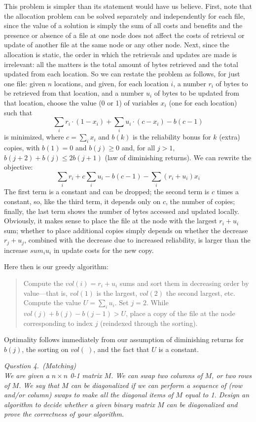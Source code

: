 \documentclass[11pt]{article}
\begin{document}
This problem is simpler than its statement would have us believe.  First, note
that the allocation problem can be solved separately and independently for each
file, since the value of a solution is simply the sum of all costs and benefits
and the presence or absence of a file at one node does not affect the costs of
retrieval or update of another file at the same node or any other node.  Next,
since the allocation is static, the order in which the retrievals and updates
are made is irrelevant: all the matters is the total amount of bytes retrieved
and the total updated from each location.  So we can restate the problem as
follows, for just one file: given $n$ locations, and given, for each location
$i$, a number $r_i$ of bytes to be retrieved from that location, and a number
$u_i$ of bytes to be updated from that location, choose the value (0 or 1) of
variables $x_i$ (one for each location) such that
  $$\sum_i r_i\cdot (1-x_i) + \sum_i u_i\cdot (c-x_i) - b(c-1)$$
is minimized, where $c=\sum_i x_i$ and $b(k)$ is the reliability bonus
for $k$ (extra) copies, with $b(1)=0$ and $b(j)\geq 0$ and, for all $j>1$,
$b(j+2)+b(j)\leq 2b(j+1)$ (law of diminishing returns).
We can rewrite the objective:
  $$\sum_i r_i + c \sum_i u_i - b(c-1) - \sum_i (r_i+u_i) x_i$$
The first term is a constant and can be dropped; the second term is $c$
times a constant, so, like the third term, it depends only on $c$, the
number of copies; finally, the last term shows the number of bytes accessed
and updated locally.  Obviously, it makes sense to
place the file at the node with the largest $r_i+u_i$ sum; whether
to place additional copies simply depends on whether the decrease
$r_j+u_j$, combined with the decrease due to increased reliability,
is larger than the increase $sum_i u_i$ in update costs for the new copy.

Here then is our greedy algorithm:
\begin{quote}
  Compute the $vol(i)=r_i+u_i$ sums and sort them in decreasing order by
  value---that is, $vol(1)$ is the largest, $vol(2)$ the second largest, etc.
  Compute the value $U=\sum_i u_i$.  Set $j=2$.  While $vol(j)+b(j)-b(j-1) > U$,
  place a copy of the file at the node corresponding to index $j$ (reindexed
  through the sorting).
\end{quote}
Optimality follows immediately from our assumption of diminishing returns
for $b(j)$, the sorting on $vol(\;)$, and the fact that $U$ is a constant.

\bigskip\rm\noindent
\emph{Question 4.~(Matching)}\\
{\footnotesize\it We are given a $n\times n$ 0-1 matrix $M$.  We can swap two columns of $M$, or
two rows of $M$.  We say that $M$ can be diagonalized if we can perform a
sequence of (row and/or column) swaps to make all the diagonal items of $M$
equal to 1.  Design an algorithm to decide whether a given binary matrix $M$
can be diagonalized and prove the correctness of your algorithm.}
\end{document}

